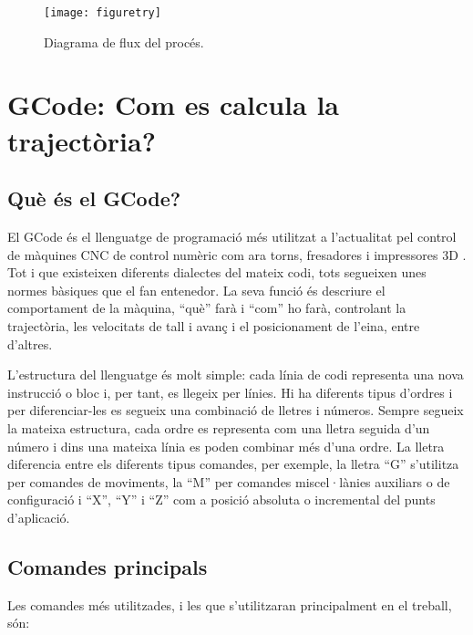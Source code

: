 \begin{figure}[H]
	\centering
	\texttt{[image: figuretry]}
	\caption{Diagrama de flux del procés.}
	\label{fig:diagflux}
\end{figure}




\section{GCode: Com es calcula la trajectòria?}

\subsection{Què és el GCode?}
El GCode és el llenguatge de programació més utilitzat a l'actualitat pel control de màquines CNC de control numèric com ara torns, fresadores i impressores 3D \cite{petersmid2008} . Tot i que existeixen diferents dialectes del mateix codi, tots segueixen unes normes bàsiques que el fan entenedor. La seva funció és descriure el comportament de la màquina, “què” farà i “com” ho farà, controlant la trajectòria, les velocitats de tall i avanç i el posicionament de l'eina, entre d'altres.

L'estructura del llenguatge és molt simple: cada línia de codi representa una nova instrucció o bloc i, per tant, es llegeix per línies. Hi ha diferents tipus d'ordres i per diferenciar-les es segueix una combinació de lletres i números. Sempre segueix la mateixa estructura, cada ordre es representa com una lletra seguida d'un número i dins una mateixa línia es poden combinar més d'una ordre. La lletra diferencia entre els diferents tipus comandes, per exemple, la lletra “G” s'utilitza per comandes de moviments, la “M” per comandes miscel·lànies auxiliars o de configuració i “X”, “Y” i “Z” com a posició absoluta o incremental del punts d'aplicació.  

\subsection{Comandes principals}
Les comandes més utilitzades, i les que s'utilitzaran principalment en el treball, són:


